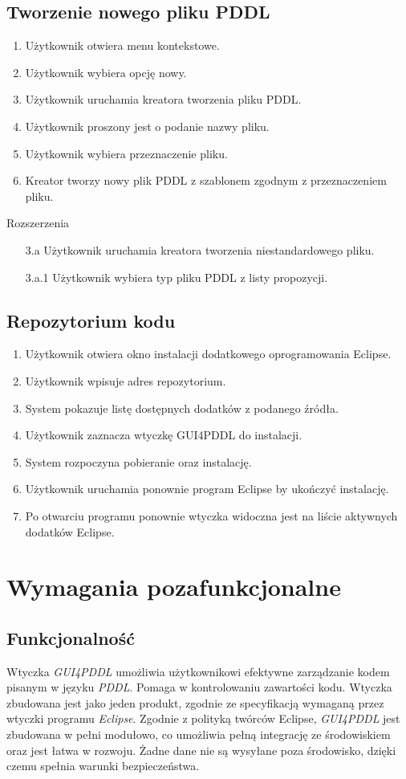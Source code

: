 \subsection{Tworzenie nowego pliku PDDL}
\begin{enumerate}
\item Użytkownik otwiera menu kontekstowe.
\item Użytkownik wybiera opcję nowy.
\item Użytkownik uruchamia kreatora tworzenia pliku PDDL.
\item Użytkownik proszony jest o podanie nazwy pliku.
\item Użytkownik wybiera przeznaczenie pliku.
\item Kreator tworzy nowy plik PDDL z szablonem zgodnym z przeznaczeniem pliku.
\end{enumerate}
Rozszerzenia
\begin{enumerate}
\item[3.a] Użytkownik uruchamia kreatora tworzenia niestandardowego pliku.
\item[3.a.1] Użytkownik wybiera typ pliku PDDL z listy propozycji.
\end{enumerate}
\subsection{Repozytorium kodu}
\begin{enumerate}
\item Użytkownik otwiera okno instalacji dodatkowego oprogramowania Eclipse.
\item Użytkownik wpisuje adres repozytorium.
\item System pokazuje listę dostępnych dodatków z podanego źródła.
\item Użytkownik zaznacza wtyczkę GUI4PDDL do instalacji.
\item System rozpoczyna pobieranie oraz instalację.
\item Użytkownik uruchamia ponownie program Eclipse by ukończyć instalację.
\item Po otwarciu programu ponownie wtyczka widoczna jest na liście aktywnych dodatków Eclipse.
\end{enumerate}
\section{Wymagania pozafunkcjonalne}
\subsection{Funkcjonalność}
Wtyczka \emph{GUI4PDDL} umożliwia użytkownikowi efektywne zarządzanie kodem pisanym w języku \emph{PDDL}. Pomaga w kontrolowaniu zawartości kodu. Wtyczka zbudowana jest jako jeden produkt, zgodnie ze specyfikacją wymaganą przez wtyczki programu \emph{Eclipse}. Zgodnie z polityką twórców Eclipse, \emph{GUI4PDDL} jest zbudowana w pełni modułowo, co umożliwia pełną integrację ze środowiskiem oraz jest łatwa w rozwoju. Żadne dane nie są wysyłane poza środowisko, dzięki czemu spełnia warunki bezpieczeństwa.
